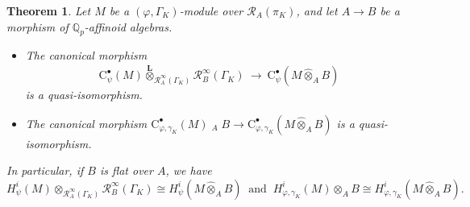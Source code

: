 \documentclass[12pt]{article}
\newtheorem{theorem}{Theorem}[subsection]
\theoremstyle{definition}
\numberwithin{equation}{theorem}
\newcommand{\calR}{\mathcal{R}}
\newcommand{\QQ}{\mathbb{Q}}
\newcommand{\bbL}{\mathbf{L}}
\newcommand{\rmC}{\mathrm{C}}
\def\Qp{\QQ_p}
\newcommand{\Lotimes}{\mathop{\stackrel{\bbL}{\otimes}}}
\begin{document}
\begin{theorem}
\label{T:base change}
Let $M$ be a $(\varphi,\Gamma_K)$-module over $\calR_A(\pi_K)$, and let $A \to B$ be
a morphism of $\Qp$-affinoid algebras.  
\begin{itemize}
\item[(1)] The canonical morphism
\[
\rmC^\bullet_\psi(M) \stackrel{\bbL}\otimes_{\calR_A^\infty(\Gamma_K)} \calR_B^\infty(\Gamma_K) \ \longrightarrow\ \rmC^\bullet_\psi(M \widehat \otimes_A B)
\]
is a quasi-isomorphism.
\item[(2)] The canonical morphism $\rmC^\bullet_{\varphi, \gamma_K}(M) \Lotimes_A B \to 
\rmC^\bullet_{\varphi, \gamma_K}(M \widehat \otimes_A B)$ is a quasi-isomorphism.
\end{itemize}
In particular, if $B$ is flat over $A$, we have 
\[
H^i_\psi(M) \otimes_{\calR_A^\infty(\Gamma_K)}
\calR_B^\infty(\Gamma_K) \cong H^i_\psi(M \widehat \otimes_A B)\ \textrm{ and }\ H_{\varphi, \gamma_K}^i(M) \otimes_A B \cong H_{\varphi, \gamma_K}^i(M \widehat \otimes_A B).
\]
\end{theorem}
\end{document}
